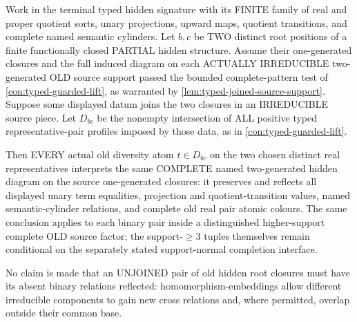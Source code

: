 \begin{lemma}
\label{lem:typed-two-root-complete-reflection}
Work in the terminal typed hidden signature
with its FINITE family of real and
proper quotient sorts, unary projections,
upward maps, quotient transitions,
and complete named semantic cylinders.
Let \(b,c\) be TWO distinct root
positions of a finite functionally
closed PARTIAL hidden structure.
Assume their one-generated closures
and the full induced diagram on
each ACTUALLY IRREDUCIBLE
two-generated OLD source support
passed the bounded complete-pattern
test of
\cref{con:typed-guarded-lift},
as warranted by
\cref{lem:typed-joined-source-support}.
Suppose some displayed datum
joins the two closures in an
IRREDUCIBLE source piece.
Let \(D_{bc}\) be the nonempty
intersection of ALL positive
typed representative-pair profiles
imposed by those data, as in
\cref{con:typed-guarded-lift}.

Then EVERY actual old diversity
atom \(t\in D_{bc}\) on the
two chosen distinct real
representatives interprets
the same COMPLETE named
two-generated hidden diagram
on the source one-generated
closures: it preserves and
reflects all displayed unary
term equalities, projection
and quotient-transition values,
named semantic-cylinder
relations, and complete old
real pair atomic colours.
The same conclusion applies
to each binary pair inside a
distinguished higher-support
complete OLD source factor;
the support-\(\ge3\) tuples
themselves remain conditional
on the separately stated
support-normal completion
interface.

No claim is made that
an UNJOINED pair of old
hidden root closures must
have its absent binary
relations reflected:
homomorphism-embeddings
allow different irreducible
components to gain
new cross relations and,
where permitted, overlap
outside their common base.
\end{lemma}
